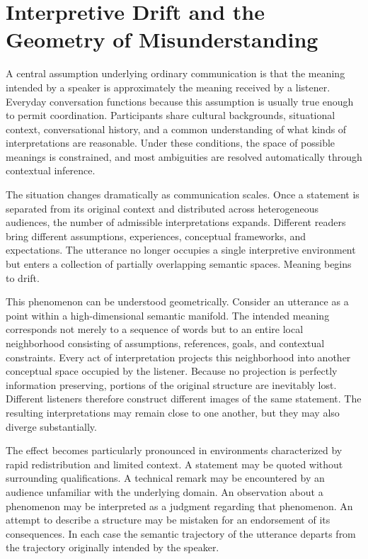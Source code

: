 \documentclass[11pt]{article}
\theoremstyle{plain}
\begin{document}
\section{Interpretive Drift and the Geometry of Misunderstanding}

A central assumption underlying ordinary communication is that the meaning intended by a speaker is approximately the meaning received by a listener. Everyday conversation functions because this assumption is usually true enough to permit coordination. Participants share cultural backgrounds, situational context, conversational history, and a common understanding of what kinds of interpretations are reasonable. Under these conditions, the space of possible meanings is constrained, and most ambiguities are resolved automatically through contextual inference.

The situation changes dramatically as communication scales. Once a statement is separated from its original context and distributed across heterogeneous audiences, the number of admissible interpretations expands. Different readers bring different assumptions, experiences, conceptual frameworks, and expectations. The utterance no longer occupies a single interpretive environment but enters a collection of partially overlapping semantic spaces. Meaning begins to drift.

This phenomenon can be understood geometrically. Consider an utterance as a point within a high-dimensional semantic manifold. The intended meaning corresponds not merely to a sequence of words but to an entire local neighborhood consisting of assumptions, references, goals, and contextual constraints. Every act of interpretation projects this neighborhood into another conceptual space occupied by the listener. Because no projection is perfectly information preserving, portions of the original structure are inevitably lost. Different listeners therefore construct different images of the same statement. The resulting interpretations may remain close to one another, but they may also diverge substantially.

The effect becomes particularly pronounced in environments characterized by rapid redistribution and limited context. A statement may be quoted without surrounding qualifications. A technical remark may be encountered by an audience unfamiliar with the underlying domain. An observation about a phenomenon may be interpreted as a judgment regarding that phenomenon. An attempt to describe a structure may be mistaken for an endorsement of its consequences. In each case the semantic trajectory of the utterance departs from the trajectory originally intended by the speaker.
\end{document}

